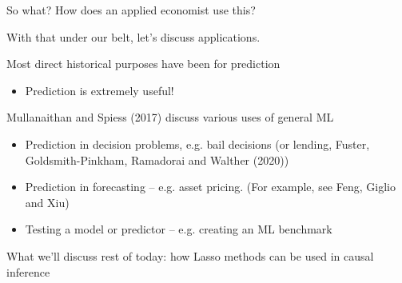 \documentclass[notes,11pt, aspectratio=169]{beamer}
\newenvironment{wideitemize}{\itemize\addtolength{\itemsep}{10pt}}{\enditemize}
\begin{document}
\begin{frame}{So what? How does an applied economist use this?}
  \begin{wideitemize}
  \item   With that under our belt, let's discuss applications.
  \item Most direct historical purposes have been for prediction
    \begin{itemize}
    \item Prediction is extremely useful! 
    \end{itemize}
  \item Mullanaithan and Spiess (2017) discuss various uses of general ML
    \begin{itemize}
    \item Prediction in decision problems, e.g. bail decisions (or
      lending, Fuster, Goldsmith-Pinkham, Ramadorai and Walther
      (2020))
    \item Prediction in forecasting -- e.g. asset pricing. (For example, see Feng, Giglio and Xiu)
    \item Testing a model or predictor -- e.g. creating an ML
      benchmark 
    \end{itemize}
  \item What we'll discuss rest of today: how Lasso methods can be
    used in causal inference
  \end{wideitemize}
\end{frame}
\end{document}

